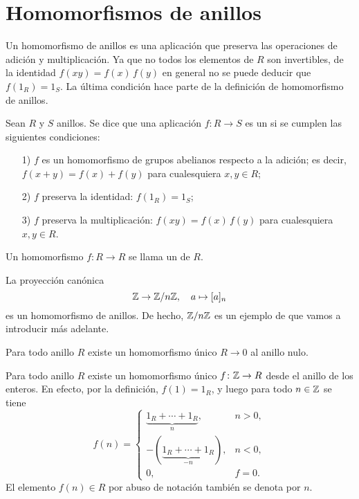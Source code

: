 
\section{Homomorfismos de anillos}

Un homomorfismo de anillos es una aplicación que preserva las operaciones
de adición y multiplicación.  Ya que no todos los elementos de $R$ son
invertibles, de la identidad $f (xy) = f(x)\,f(y)$ en general no se puede
deducir que $f (1_R) = 1_S$. La última condición hace parte de la definición
de homomorfismo de anillos.

\begin{definicion}
  Sean $R$ y $S$ anillos. Se dice que una aplicación $f\colon R\to S$ es
  un  si se cumplen
  las siguientes condiciones:
  \begin{enumerate}
  \item[1)] $f$ es un homomorfismo de grupos abelianos respecto a la adición;
    es decir, $f (x+y) = f (x) + f (y)$ para cualesquiera $x,y\in R$;

  \item[2)] $f$ preserva la identidad: $f (1_R) = 1_S$;

  \item[3)] $f$ preserva la multiplicación: $f (xy) = f(x)\,f(y)$ para
    cualesquiera $x,y\in R$.
  \end{enumerate}

  Un homomorfismo $f\colon R\to R$ se llama
  un  de $R$.
\end{definicion}

\begin{ejemplo}
  La proyección canónica
  $$\mathbb{Z} \to \mathbb{Z}/n\mathbb{Z}, \quad a \mapsto [a]_n$$
  es un homomorfismo de anillos. De hecho, $\mathbb{Z}/n\mathbb{Z}$ es un ejemplo
  de  que vamos a introducir más adelante.
\end{ejemplo}

\begin{ejemplo}
  Para todo anillo $R$ existe un homomorfismo único $R \to 0$ al anillo nulo.
\end{ejemplo}

\begin{ejemplo}
  Para todo anillo $R$ existe un homomorfismo único $f\colon \mathbb{Z} \to R$ desde
  el anillo de los enteros. En efecto, por la definición, $f (1) = 1_R$, y luego
  para todo $n\in \mathbb{Z}$ se tiene
  \[ f (n) = \begin{cases}
      \underbrace{1_R + \cdots + 1_R}_n, & n > 0,\\
      -(\underbrace{1_R + \cdots + 1_R}_{-n}), & n < 0,\\
      0, & f = 0.
    \end{cases} \]
  El elemento $f (n) \in R$ por abuso de notación también se denota por $n$.
\end{ejemplo}

